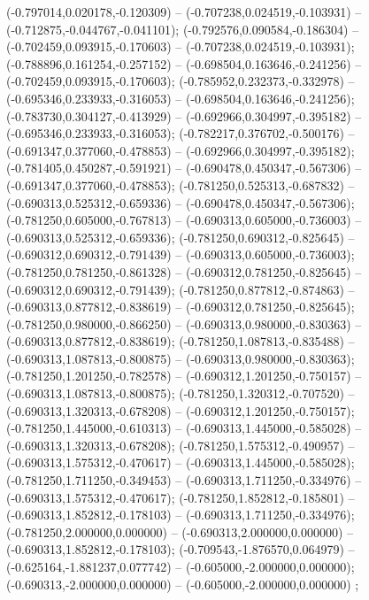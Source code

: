  (-0.797014,0.020178,-0.120309) -- (-0.707238,0.024519,-0.103931) -- (-0.712875,-0.044767,-0.041101);
 (-0.792576,0.090584,-0.186304) -- (-0.702459,0.093915,-0.170603) -- (-0.707238,0.024519,-0.103931);
 (-0.788896,0.161254,-0.257152) -- (-0.698504,0.163646,-0.241256) -- (-0.702459,0.093915,-0.170603);
 (-0.785952,0.232373,-0.332978) -- (-0.695346,0.233933,-0.316053) -- (-0.698504,0.163646,-0.241256);
 (-0.783730,0.304127,-0.413929) -- (-0.692966,0.304997,-0.395182) -- (-0.695346,0.233933,-0.316053);
 (-0.782217,0.376702,-0.500176) -- (-0.691347,0.377060,-0.478853) -- (-0.692966,0.304997,-0.395182);
 (-0.781405,0.450287,-0.591921) -- (-0.690478,0.450347,-0.567306) -- (-0.691347,0.377060,-0.478853);
 (-0.781250,0.525313,-0.687832) -- (-0.690313,0.525312,-0.659336) -- (-0.690478,0.450347,-0.567306);
 (-0.781250,0.605000,-0.767813) -- (-0.690313,0.605000,-0.736003) -- (-0.690313,0.525312,-0.659336);
 (-0.781250,0.690312,-0.825645) -- (-0.690312,0.690312,-0.791439) -- (-0.690313,0.605000,-0.736003);
 (-0.781250,0.781250,-0.861328) -- (-0.690312,0.781250,-0.825645) -- (-0.690312,0.690312,-0.791439);
 (-0.781250,0.877812,-0.874863) -- (-0.690313,0.877812,-0.838619) -- (-0.690312,0.781250,-0.825645);
 (-0.781250,0.980000,-0.866250) -- (-0.690313,0.980000,-0.830363) -- (-0.690313,0.877812,-0.838619);
 (-0.781250,1.087813,-0.835488) -- (-0.690313,1.087813,-0.800875) -- (-0.690313,0.980000,-0.830363);
 (-0.781250,1.201250,-0.782578) -- (-0.690312,1.201250,-0.750157) -- (-0.690313,1.087813,-0.800875);
 (-0.781250,1.320312,-0.707520) -- (-0.690313,1.320313,-0.678208) -- (-0.690312,1.201250,-0.750157);
 (-0.781250,1.445000,-0.610313) -- (-0.690313,1.445000,-0.585028) -- (-0.690313,1.320313,-0.678208);
 (-0.781250,1.575312,-0.490957) -- (-0.690313,1.575312,-0.470617) -- (-0.690313,1.445000,-0.585028);
 (-0.781250,1.711250,-0.349453) -- (-0.690313,1.711250,-0.334976) -- (-0.690313,1.575312,-0.470617);
 (-0.781250,1.852812,-0.185801) -- (-0.690313,1.852812,-0.178103) -- (-0.690313,1.711250,-0.334976);
 (-0.781250,2.000000,0.000000) -- (-0.690313,2.000000,0.000000) -- (-0.690313,1.852812,-0.178103);
 (-0.709543,-1.876570,0.064979) -- (-0.625164,-1.881237,0.077742) -- (-0.605000,-2.000000,0.000000);
 (-0.690313,-2.000000,0.000000) -- (-0.605000,-2.000000,0.000000) ;
